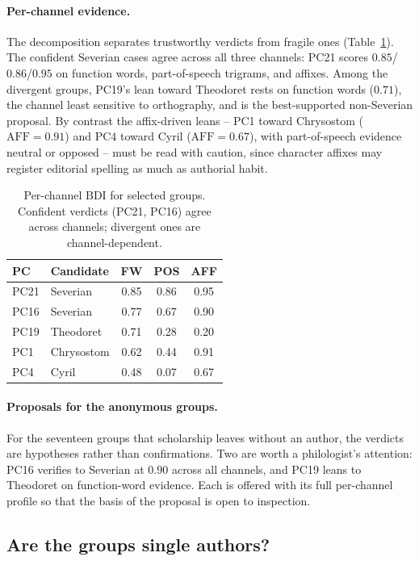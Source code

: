 \documentclass{anthology-ch}
\begin{document}
\paragraph{Per-channel evidence.} The decomposition separates trustworthy verdicts from fragile ones (Table~\ref{tab:channels}). The confident Severian cases agree across all three channels: PC21 scores $0.85$/$0.86$/$0.95$ on function words, part-of-speech trigrams, and affixes. Among the divergent groups, PC19's lean toward Theodoret rests on function words ($0.71$), the channel least sensitive to orthography, and is the best-supported non-Severian proposal. By contrast the affix-driven leans -- PC1 toward Chrysostom ($\text{AFF}=0.91$) and PC4 toward Cyril ($\text{AFF}=0.67$), with part-of-speech evidence neutral or opposed -- must be read with caution, since character affixes may register editorial spelling as much as authorial habit.

\begin{table}[t]
  \centering
  \small
  \begin{tabular}{llccc}
    \toprule
    PC & Candidate & FW & POS & AFF \\
    \midrule
    PC21 & Severian   & 0.85 & 0.86 & 0.95 \\
    PC16 & Severian   & 0.77 & 0.67 & 0.90 \\
    PC19 & Theodoret  & 0.71 & 0.28 & 0.20 \\
    PC1  & Chrysostom & 0.62 & 0.44 & 0.91 \\
    PC4  & Cyril      & 0.48 & 0.07 & 0.67 \\
    \bottomrule
  \end{tabular}
  \caption{Per-channel BDI for selected groups. Confident verdicts (PC21, PC16) agree across channels; divergent ones are channel-dependent.}
  \label{tab:channels}
\end{table}

\paragraph{Proposals for the anonymous groups.} For the seventeen groups that scholarship leaves without an author, the verdicts are hypotheses rather than confirmations. Two are worth a philologist's attention: PC16 verifies to Severian at $0.90$ across all channels, and PC19 leans to Theodoret on function-word evidence. Each is offered with its full per-channel profile so that the basis of the proposal is open to inspection.

\subsection{Are the groups single authors?}
\end{document}
